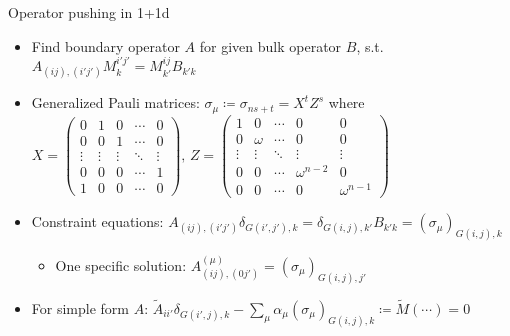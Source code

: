 \documentclass{fdubeamer}
\begin{document}
\begin{frame}{Operator pushing in 1+1d}

\linespread{1.4}
\selectfont

\begin{itemize}
  \item Find boundary operator $A$ for given bulk operator $B$, s.t. \\[0.8ex]
    \mbox{\qquad}
    \begingroup
      \scriptsize
      \tikzset{x=1em, y=1em, node font=\tiny}
    \endgroup
    \quad\textrightarrow\quad
    $A_{(ij), (i'j')} M^{i'j'}_{ k} = M^{ij}_{k'} B_{k'k}$
  \item Generalized Pauli matrices: $\sigma_\mu \coloneq \sigma_{ns+t} = X^t Z^s$ where \\[1ex]
    \mbox{\qquad}
    $
      X = \left( \begin{smallmatrix}
        0      & 1      & 0      & \cdots & 0      \\
        0      & 0      & 1      & \cdots & 0      \\
        \vdots & \vdots & \vdots & \ddots & \vdots \\
        0      & 0      & 0      & \cdots & 1      \\
        1      & 0      & 0      & \cdots & 0
      \end{smallmatrix} \right)\!, \,
      Z = \left( \begin{smallmatrix}
        1      & 0      & \cdots & 0            & 0      \\
        0      & \omega & \cdots & 0            & 0      \\
        \vdots & \vdots & \ddots & \vdots       & \vdots \\
        0      & 0      & \cdots & \omega^{n-2} & 0      \\
        0      & 0      & \cdots & 0            & \omega^{n-1}
      \end{smallmatrix} \right)
    $
    \vspace{0.5ex}
  \item Constraint equations: $A_{(ij), (i'j')} \delta_{G(i',j'), k} = \delta_{G(i,j), k'} B_{k'k} = (\sigma_\mu)_{G(i,j), k}$

    \begin{itemize}
      \item One specific solution: $A^{(\mu)}_{(ij), (0j')} = (\sigma_\mu)_{G(i,j), j'}$
    \end{itemize}

  \item For simple form $A$: $\tilde{A}_{ii'} \delta_{G(i',j), k} - \sum_\mu \alpha_\mu (\sigma_\mu)_{G(i,j), k} \coloneq \tilde{M}(\cdots) = 0$
\end{itemize}

\end{frame}
\end{document}
